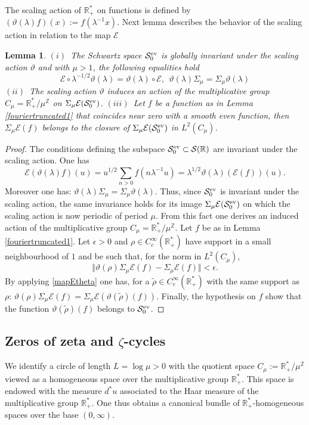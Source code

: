 \documentclass[cupthm]{CUP-JNL-JMJ}
\def\R{{\mathbb R}}
\def\Z{{\mathbb Z}}
\def\cE{{\mathcal E}}
\def\cS{{\mathcal S}}
\def\rep{\vartheta}
\def\sr0{{\cS^{\rm ev}_0}}
\numberwithin{equation}{section}
\theoremstyle{cupplain}
\newtheorem{lemma}[theorem]{Lemma}
\theoremstyle{cupdefinition}
\theoremstyle{cupremark}
\theoremstyle{cupproof}
\newtheorem{proof}{Proof}
\begin{document}
The scaling action of $\R^*_+$ on functions  is  defined by $(\rep(\lambda)f)(x):=f(\lambda^{-1}x)$. 
Next lemma describes the behavior of the scaling action in relation to the map $\cE$
\begin{lemma}\label{scalingact}$(i)$~The Schwartz space $\sr0$ is globally invariant under the scaling action $\rep$ and with $\mu>1$, the following equalities hold 
\begin{equation}\label{mapEtheta}
	\cE \circ\lambda^{-1/2}\rep(\lambda)=\rep(\lambda)\circ \cE, \ \ \rep(\lambda)\Sigma_\mu=\Sigma_\mu \rep(\lambda)
\end{equation}	
$(ii)$~The  scaling action $\rep$ induces an action of the multiplicative group $C_\mu= \R_+^*/\mu^{\Z}$ on  $\Sigma_\mu \cE(\sr0)$.\newline
$(iii)$~Let $f$ be  a function as in Lemma \ref{fouriertruncated1} that coincides near zero with a smooth even function, then $\Sigma_\mu\cE(f)$ belongs to the closure of $\Sigma_\mu \cE(\sr0)$ in $L^2(C_\mu)$.
\end{lemma}
\begin{proof} The conditions defining the subspace $\sr0\subset \cS(\R)$ are invariant under the scaling action. One has
$$
\cE(\rep(\lambda)f)(u)=u^{1/2}\sum_{n> 0} f(n\lambda^{-1}u)=\lambda^{1/2}\rep(\lambda)(\cE(f))(u).
$$
Moreover one has: $\rep(\lambda)\Sigma_\mu=\Sigma_\mu \rep(\lambda)$. Thus, since $\sr0$ is invariant under the scaling action, the same invariance holds for its image  $\Sigma_\mu \cE(\sr0)$ on which the scaling action is now periodic of period $\mu$. From this fact one derives an  induced  action of the multiplicative group $C_\mu=\R_+^*/\mu^{\Z}$. Let $f$ be as in Lemma \ref{fouriertruncated1}. Let $\epsilon >0$ and $\rho\in C_c^{\infty}(\R_+^*)$ have support in a small neighbourhood of $1$ and be such that, for the norm in $L^2(C_\mu)$, $$\Vert\rep(\rho)\Sigma_\mu \cE(f)-\Sigma_\mu \cE(f)\Vert<\epsilon.$$
By applying \eqref{mapEtheta} one has, for a  $\tilde\rho\in C_c^{\infty}(\R_+^*)$ with the same support as $\rho$: $\rep(\rho)\Sigma_\mu \cE(f)=\Sigma_\mu \cE(\rep(\tilde\rho)(f))$. Finally, the hypothesis on $f$ show that the function $\rep(\tilde\rho)(f)$ belongs to $\sr0$. \end{proof} 
 





\subsection{Zeros of zeta and $\zeta$-cycles}\label{sec6.2}
We identify a circle of length $L=\log \mu>0$ with the quotient space $C_\mu:=\R_+^*/\mu^{\Z}$ viewed as a homogeneous space over the multiplicative group $\R_+^*$. This space is endowed with the measure $d^*u$ associated to the Haar measure of the multiplicative group $\R_+^*$. One thus obtains a canonical bundle of $\R_+^*$-homogeneous spaces over the base $(0,\infty)$. 
\end{document}
